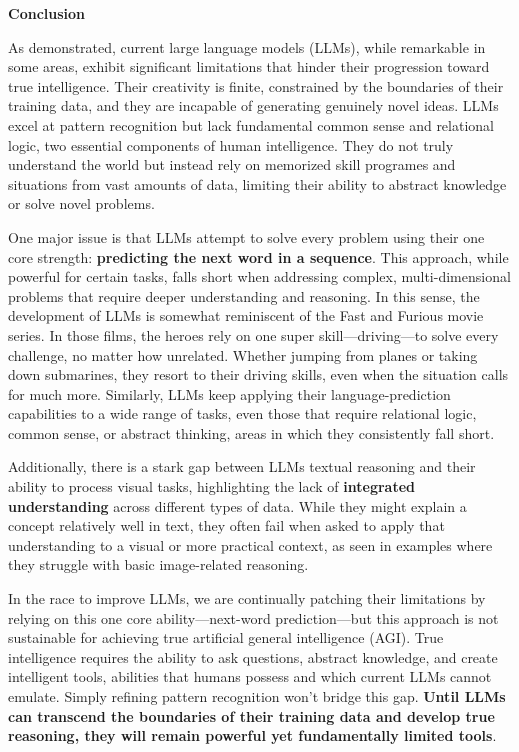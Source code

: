 \documentclass[11pt]{scrartcl}
\begin{document}
\vspace{1cm}

\begin{huge}
\textbf{Conclusion}
\end{huge}
As demonstrated, current large language models (LLMs), while remarkable in some areas, exhibit significant limitations that hinder their progression toward true intelligence. Their creativity is finite, constrained by the boundaries of their training data, and they are incapable of generating genuinely novel ideas. LLMs excel at pattern recognition but lack fundamental common sense and relational logic, two essential components of human intelligence. They do not truly understand the world but instead rely on memorized skill programes and situations from vast amounts of data, limiting their ability to abstract knowledge or solve novel problems.

One major issue is that LLMs attempt to solve every problem using their one core strength: \textbf{predicting the next word in a sequence}. This approach, while powerful for certain tasks, falls short when addressing complex, multi-dimensional problems that require deeper understanding and reasoning. In this sense, the development of LLMs is somewhat reminiscent of the Fast and Furious movie series. In those films, the heroes rely on one super skill—driving—to solve every challenge, no matter how unrelated. Whether jumping from planes or taking down submarines, they resort to their driving skills, even when the situation calls for much more. Similarly, LLMs keep applying their language-prediction capabilities to a wide range of tasks, even those that require relational logic, common sense, or abstract thinking, areas in which they consistently fall short.

Additionally, there is a stark gap between LLMs textual reasoning and their ability to process visual tasks, highlighting the lack of \textbf{integrated understanding} across different types of data. While they might explain a concept relatively well in text, they often fail when asked to apply that understanding to a visual or more practical context, as seen in examples where they struggle with basic image-related reasoning.

In the race to improve LLMs, we are continually patching their limitations by relying on this one core ability—next-word prediction—but this approach is not sustainable for achieving true artificial general intelligence (AGI). True intelligence requires the ability to ask questions, abstract knowledge, and create intelligent tools, abilities that humans possess and which current LLMs cannot emulate. Simply refining pattern recognition won’t bridge this gap. \textbf{Until LLMs can transcend the boundaries of their training data and develop true reasoning, they will remain powerful yet fundamentally limited tools}. 
\end{document}
